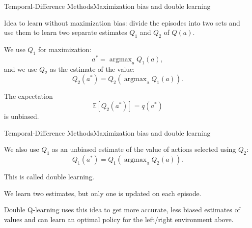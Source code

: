 \documentclass{beamer}
\DeclareMathOperator*{\argmax}{argmax}
\begin{document}
\begin{frame}{Temporal-Difference Methods}{Maximization bias and double learning}

  Idea to learn without maximization bias: divide the episodes into \alert{two
    sets} and use them to learn two separate estimates $Q_1$ and $Q_2$ of
  $Q(a)$.

  \medskip

  We use $Q_1$ for maximization: $$a^* = \argmax_a Q_1(a),$$
  and we use $Q_2$ as the estimate of the value:
  $$Q_2(a^*) = Q_2(\argmax_a Q_1(a)).$$

  The expectation $$\mathbb{E}\left[ Q_2(a^*) \right] = q(a^*)$$ is
  unbiased.
  
\end{frame}


\begin{frame}{Temporal-Difference Methods}{Maximization bias and double learning}

  We also use $Q_1$ as an unbiased estimate of the value of actions selected
  using $Q_2$: $$Q_1(a^*)=Q_1(\argmax_a Q_2(a)).$$

  This is called \alert{double learning}.

  \medskip

  We learn two estimates, but only one is updated on each episode.

  \medskip

  \alert{Double Q-learning} uses this idea to get more accurate, less
  biased estimates of values and can learn an optimal policy for the
  left/right environment above.
  
\end{frame}
\end{document}
